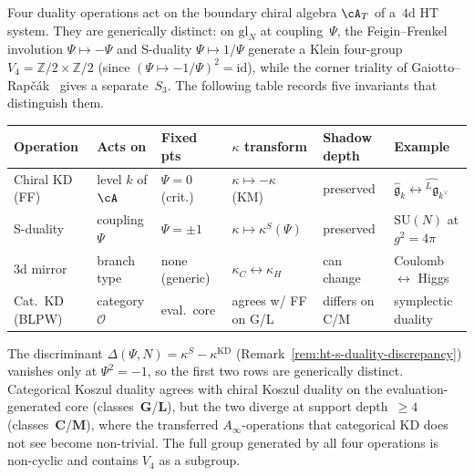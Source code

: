 \begin{remark}
\label{rem:ht-four-dualities-comparison}
Four duality operations act on the boundary chiral algebra
$\cA_T$ of a~$4$d HT system. They are generically distinct:
on $\mathrm{gl}_N$ at coupling~$\Psi$,
the Feigin--Frenkel involution $\Psi \mapsto -\Psi$
and S-duality $\Psi \mapsto 1/\Psi$
generate a Klein four-group
$V_4 = \mathbb{Z}/2 \times \mathbb{Z}/2$
(since $(\Psi \mapsto -1/\Psi)^2 = \mathrm{id}$),
while the corner triality of
Gaiotto--Rap\v{c}\'ak~\cite{gaiotto-rapchak}
gives a separate~$S_3$.
The following table records five invariants that distinguish them.

\begin{center}
\renewcommand{\arraystretch}{1.25}
\footnotesize
\begin{tabular}{llllll}
\toprule
\textbf{Operation}
& \textbf{Acts on}
& \textbf{Fixed pts}
& \textbf{$\kappa$ transform}
& \textbf{Shadow depth}
& \textbf{Example} \\
\midrule
Chiral KD (FF)
 & level $k$ of $\cA$
 & $\Psi = 0$ (crit.)
 & $\kappa \mapsto -\kappa$ (KM)
 & preserved
 & $\widehat{\mathfrak{g}}_k \leftrightarrow
 \widehat{{}^L\!\mathfrak{g}}_{k^\vee}$ \\[3pt]
S-duality
 & coupling $\Psi$
 & $\Psi = \pm 1$
 & $\kappa \mapsto \kappa^S(\Psi)$
 & preserved
 & $\mathrm{SU}(N)$ at $g^2 = 4\pi$ \\[3pt]
3d mirror
 & branch type
 & none (generic)
 & $\kappa_C \leftrightarrow \kappa_H$
 & can change
 & Coulomb $\leftrightarrow$ Higgs \\[3pt]
Cat.\ KD (BLPW)
 & category $\mathcal{O}$
 & eval.\ core
 & agrees w/ FF on G/L
 & differs on C/M
 & symplectic duality~\cite{BLPW16} \\
\bottomrule
\end{tabular}
\end{center}

\noindent
The discriminant $\Delta(\Psi,N) = \kappa^S - \kappa^{\mathrm{KD}}$
(Remark~\ref{rem:ht-s-duality-discrepancy})
vanishes only at $\Psi^2 = -1$, so the first two rows are
generically distinct. Categorical Koszul duality
agrees with chiral Koszul duality on the evaluation-generated
core (classes~$\mathbf{G}$/$\mathbf{L}$), but the two diverge
at support depth~$\geq 4$ (classes~$\mathbf{C}$/$\mathbf{M}$),
where the transferred $A_\infty$-operations
that categorical KD does not see become non-trivial.
The full group generated by all four operations is
non-cyclic and contains $V_4$ as a subgroup.
\end{remark}

